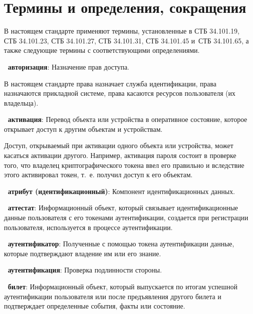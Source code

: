 \chapter{Термины и определения, сокращения}\label{TERMS}

В настоящем стандарте применяют термины, установленные в СТБ 34.101.19, 
СТБ 34.101.23, СТБ 34.101.27, СТБ 34.101.31, СТБ 34.101.45 и~СТБ 34.101.65, 
а также следующие термины с соответствующими определениями. 

{\bf \thedefctr~авторизация}:
Назначение прав доступа.

\begin{note*}
В настоящем стандарте права назначает служба идентификации,
права назначаются прикладной системе, права касаются ресурсов пользователя
(их владельца).
\end{note*}

{\bf \thedefctr~активация}:
Перевод объекта или устройства в оперативное состояние,
которое открывает доступ к другим объектам и устройствам. 

\begin{note*}
Доступ, открываемый при активации одного объекта или устройства,
может касаться активации другого.
%
Например, активация пароля состоит в проверке того, что 
владелец криптографического токена ввел его правильно 
и вследствие этого активировал токен, т.~е. получил доступ к его объектам.  
\end{note*}

{\bf \thedefctr~атрибут (идентификационный)}:
Компонент идентификационных данных.

{\bf \thedefctr~аттестат}:
Информационный объект, который связывает идентификационные 
данные пользователя с его токенами аутентификации,
создается при регистрации пользователя,
используется в процессе аутентификации.

{\bf \thedefctr~аутентификатор}:
Полученные с помощью токена аутентификации данные, 
которые подтверждают владение им или его знание. 

{\bf \thedefctr~аутентификация}:
Проверка подлинности стороны.


{\bf \thedefctr~билет}:
Информационный объект, который выпускается по итогам успешной аутентификации
пользователя или после предъявления другого билета и подтверждает определенные  
события, факты или состояние. 



